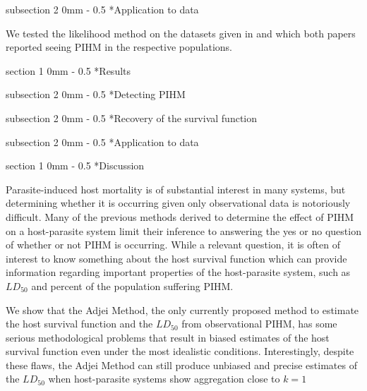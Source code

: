 \documentclass[12pt, a4paper]{article}
\makeatletter
\renewcommand{\section}{\@startsection
{section}%
{1}%
{0mm}%
{-\baselineskip}%
{0.5\baselineskip}%
{\normalfont\bf\large}} %
\renewcommand{\subsection}{\@startsection
{subsection}%
{2}%
{0mm}%
{-\baselineskip}%
{0.5\baselineskip}%
{\normalfont\bf}} %
\makeatother
\begin{document}
\subsection*{Application to data}

We tested the likelihood method on the datasets given in \citep{Crofton1971a} and \citep{Adjei1986} which both papers reported seeing PIHM in the respective populations.

\section*{Results}

\subsection*{Detecting PIHM}

\subsection*{Recovery of the survival function}

\subsection*{Application to data}


\section*{Discussion}

Parasite-induced host mortality is of substantial interest in many systems, but determining whether it is occurring given only observational data is notoriously difficult.  Many of the previous methods derived to determine the effect of PIHM on a host-parasite system limit their inference to answering the yes or no question of whether or not PIHM is occurring.  While a relevant question, it is often of interest to know something about the host survival function which can provide information regarding important properties of the host-parasite system, such as $LD_{50}$ and percent of the population suffering PIHM.

We show that the Adjei Method, the only currently proposed method to estimate the host survival function and the $LD_{50}$ from observational PIHM, has some serious methodological problems that result in biased estimates of the host survival function even under the most idealistic conditions.  Interestingly, despite these flaws, the Adjei Method can still produce unbiased and precise estimates of the $LD_{50}$ when host-parasite systems show aggregation close to $k = 1$
\end{document}
